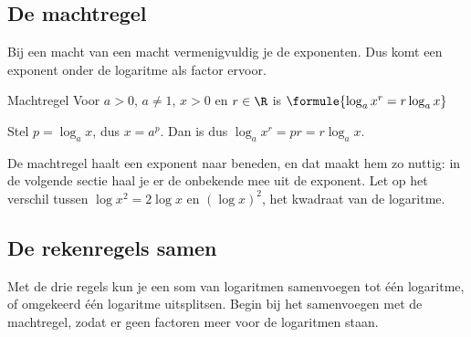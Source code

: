 \begin{oefeningen}
\end{oefeningen}

\subsection{De machtregel}

Bij een macht van een macht vermenigvuldig je de exponenten. Dus komt een exponent onder de logaritme als factor ervoor.

\begin{theorie}
\begin{stelling}{Machtregel}
Voor $a > 0$, $a \neq 1$, $x > 0$ en $r \in \R$ is \qquad $\formule{\log_a x^r = r \log_a x}$
\end{stelling}
\begin{bewijs}
Stel $p = \log_a x$, dus $x = a^p$. Dan is
dus $\log_a x^r = pr = r \log_a x$.
\end{bewijs}
\end{theorie}

De machtregel haalt een exponent naar beneden, en dat maakt hem zo nuttig: in de volgende sectie haal je er de onbekende mee uit de exponent. Let op het verschil tussen $\log x^2 = 2\log x$ en $(\log x)^2$, het kwadraat van de logaritme.


\begin{oefeningen}
\end{oefeningen}

\subsection{De rekenregels samen}

Met de drie regels kun je een som van logaritmen samenvoegen tot één logaritme, of omgekeerd één logaritme uitsplitsen. Begin bij het samenvoegen met de machtregel, zodat er geen factoren meer voor de logaritmen staan.


